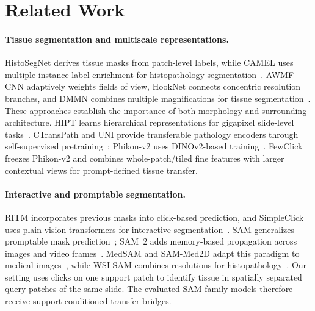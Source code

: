 \section{Related Work}
\paragraph{Tissue segmentation and multiscale representations.}
HistoSegNet derives tissue masks from patch-level labels, while CAMEL uses multiple-instance label enrichment for histopathology segmentation~\cite{chan2019histosegnet,xu2019camel}. AWMF-CNN adaptively weights fields of view, HookNet connects concentric resolution branches, and DMMN combines multiple magnifications for tissue segmentation~\cite{tokunaga2019awmf,vanrijthoven2021hooknet,ho2021dmmn}. These approaches establish the importance of both morphology and surrounding architecture. HIPT learns hierarchical representations for gigapixel slide-level tasks~\cite{chen2022hipt}. CTransPath and UNI provide transferable pathology encoders through self-supervised pretraining~\cite{wang2022ctranspath,chen2024uni}; Phikon-v2 uses DINOv2-based training~\cite{filiot2024phikon,oquab2024dinov2}. FewClick freezes Phikon-v2 and combines whole-patch/tiled fine features with larger contextual views for prompt-defined tissue transfer.

\paragraph{Interactive and promptable segmentation.}
RITM incorporates previous masks into click-based prediction, and SimpleClick uses plain vision transformers for interactive segmentation~\cite{sofiiuk2022ritm,liu2023simpleclick}. SAM generalizes promptable mask prediction~\cite{kirillov2023sam}; SAM~2 adds memory-based propagation across images and video frames~\cite{ravi2024sam2}. MedSAM and SAM-Med2D adapt this paradigm to medical images~\cite{ma2024medsam,cheng2023sammed2d}, while WSI-SAM combines resolutions for histopathology~\cite{liu2024wsisam}. Our setting uses clicks on one support patch to identify tissue in spatially separated query patches of the same slide. The evaluated SAM-family models therefore receive support-conditioned transfer bridges.

